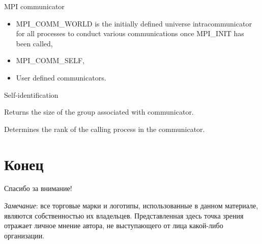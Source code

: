 \documentclass{beamer}
\begin{document}


\begin{frame}{MPI communicator}

\begin{itemize}
	\item MPI_COMM_WORLD is the initially defined universe intracommunicator for all processes to conduct various communications once MPI_INIT has been called,
	\item MPI_COMM_SELF,
	\item User defined communicators.
\end{itemize}

\end{frame}

\begin{frame}{Self-identification}

\size

Returns the size of the group associated with communicator.

\vfill

\rank

Determines the rank of the calling process in the communicator.

\end{frame}

\section{Конец}
\begin{frame}

{\huge{Спасибо за внимание!}\par}

\vfill

\tiny{\textit{Замечание}: все торговые марки и логотипы, использованные в данном материале, являются собственностью их владельцев. Представленная здесь точка зрения отражает личное мнение автора, не выступающего от лица какой-либо организации.}

\end{frame}
\end{document}
